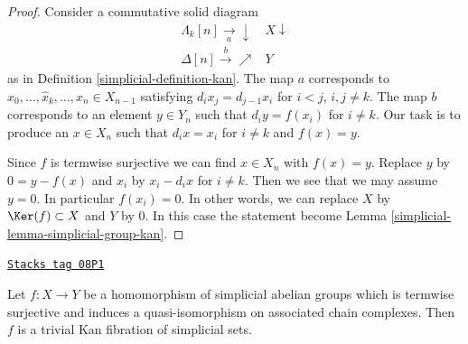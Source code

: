 \begin{proof}

Consider a commutative solid diagram
$$
\begin{array}{cc}\Lambda_k[n] \underset{a}{\longrightarrow}\downarrow & X \downarrow \\ \Delta[n] \overset{b}{\longrightarrow}\nearrow & Y\end{array}
$$
as in Definition \ref{simplicial-definition-kan}. The map $a$ corresponds
to $x_0, \ldots, \hat x_k, \ldots, x_n \in X_{n - 1}$ satisfying
$d_i x_j = d_{j - 1} x_i$ for $i < j$, $i, j \not = k$.
The map $b$ corresponds to an element $y \in Y_n$ such
that $d_iy = f(x_i)$ for $i \not = k$. Our task is to produce an
$x \in X_n$ such that $d_ix = x_i$ for $i \not = k$ and $f(x) = y$.

\medskip\noindent
Since $f$ is termwise surjective we can find $x \in X_n$ with $f(x) = y$.
Replace $y$ by $0 = y - f(x)$ and $x_i$ by $x_i - d_ix$ for $i \not = k$.
Then we see that we may assume $y = 0$. In particular $f(x_i) = 0$.
In other words, we can replace $X$ by $\Ker(f) \subset X$
and $Y$ by $0$. In this case the statement become
Lemma \ref{simplicial-lemma-simplicial-group-kan}.
\end{proof}

\begin{lemma}
\label{simplicial-lemma-qis-simplicial-abelian-groups}
\href{https://stacks.math.columbia.edu/tag/08P1}{\texttt{Stacks tag 08P1}}

Let $f : X \to Y$ be a homomorphism of simplicial abelian groups
which is termwise surjective and induces a quasi-isomorphism on
associated chain complexes. Then $f$ is a trivial Kan fibration of
simplicial sets.
\end{lemma}

